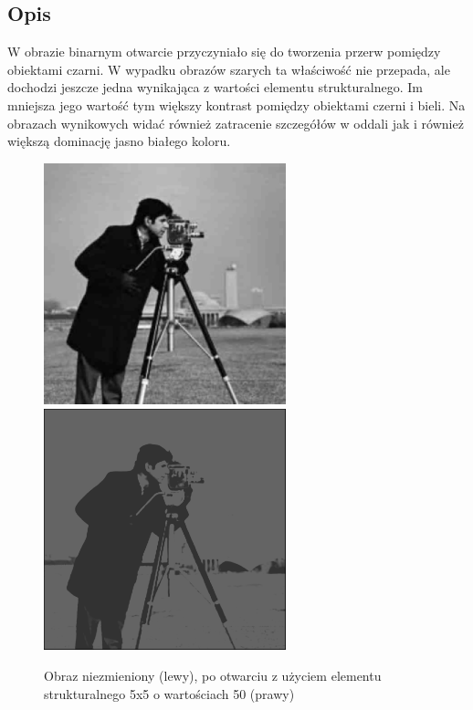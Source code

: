 \documentclass[a4paper,12pt]{book}
\begin{document}
\subsection{Opis}
W obrazie binarnym otwarcie przyczyniało się do tworzenia przerw pomiędzy obiektami czarni. W wypadku obrazów szarych ta właściwość nie przepada, ale dochodzi jeszcze jedna wynikająca z wartości elementu strukturalnego. Im mniejsza jego wartość tym większy kontrast pomiędzy obiektami czerni i bieli. Na obrazach wynikowych widać również zatracenie szczegółów w oddali jak i również większą dominację jasno białego koloru. 
\begin{figure}[H]
	\caption{Obraz niezmieniony (lewy), po otwarciu z użyciem elementu strukturalnego 5x5 o wartościach 50 (prawy)}
	\includegraphics[width=7cm, height=7cm]{man-unmodified.jpg}
	\includegraphics[width=7cm, height=7cm]{morph-gray-opening-strel5x5-50.png}
\end{figure}
\end{document}
